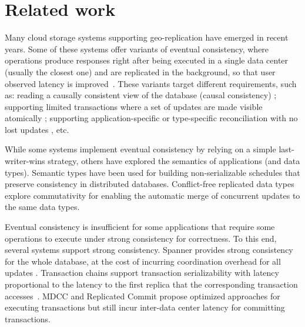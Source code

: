 \section{Related work}
\label{sec:rel}

Many cloud storage systems supporting geo-replication have emerged in recent years.
Some of these systems offer variants of eventual consistency, where operations produce
responses right after being executed in a single data center (usually the closest
one) and are replicated in the background, so that user observed latency is improved~\cite{dynamo,cops,eiger,chainreaction,cassandra}.
These variants target different requirements, such as: reading a causally consistent view of the database (causal consistency) \cite{cops,chainreaction,orbe,bolton}; supporting limited transactions where a set of updates are made visible atomically \cite{eiger,ramp}; supporting application-specific or type-specific reconciliation with no lost updates \cite{dynamo,cops,walter,riak}, etc.

While some systems implement eventual consistency by relying on a simple last-writer-wins
strategy, others have explored the semantics of applications (and data types).
Semantic types \cite{semanticDDB} have been used for building non-serializable 
schedules that preserve consistency in distributed databases. 
Conflict-free replicated data types~\cite{crdts} explore commutativity 
for enabling the automatic merge of concurrent updates to the same data types.

Eventual consistency is insufficient for some applications that require 
some operations to execute under strong consistency for correctness. 
To this end, several systems support strong consistency. 
Spanner provides strong consistency for the whole database, at the cost
of incurring coordination overhead for all updates  \cite{spanner}. 
Transaction chains support transaction serializability with latency
proportional to the latency to the first replica that the corresponding transaction accesses~\cite{transactionchains}.
MDCC \cite{mdcc} and Replicated Commit \cite{replicatedcommit} propose optimized approaches for executing transactions but still incur inter-data center latency for committing transactions.

